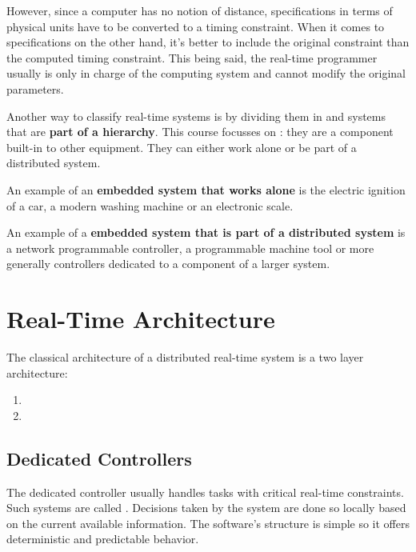 \documentclass[../main.tex]{subfiles}
\begin{document}
However, since a computer has no notion of distance, specifications in terms of physical units have to be converted to a timing constraint.
When it comes to specifications on the other hand, it's better to include the original constraint than the computed timing constraint.
This being said, the real-time programmer usually is only in charge of the computing system and cannot modify the original parameters.

Another way to classify real-time systems is by dividing them in  and systems that are \textbf{part of a hierarchy}. This course focusses on : they are a component built-in to other equipment. They can either work alone or be part of a distributed system.

\begin{exmp}
An example of an \textbf{embedded system that works alone} is the electric ignition of a car, a modern washing machine or an electronic scale.
\end{exmp} 

\begin{exmp}
An example of a \textbf{embedded system that is part of a distributed system} is a network programmable controller, a programmable machine tool or more generally controllers dedicated to a component of a larger system.
\end{exmp} 


\section{Real-Time Architecture}
The classical architecture of a distributed real-time system is a two layer architecture:
\begin{enumerate}
	\item {} 
	\item {}
\end{enumerate}

\subsection{Dedicated Controllers}
The dedicated controller usually handles tasks with critical real-time constraints. Such systems are called . Decisions taken by the system are done so locally based on the current available information. The software's structure is simple so it offers deterministic and predictable behavior. 
 
\end{document}
